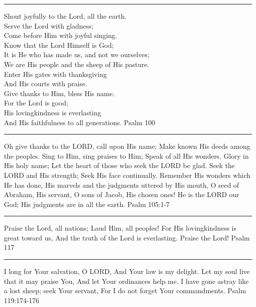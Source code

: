 \documentclass[]{book}
\begin{document}
\begin{center}\rule{0.5\linewidth}{\linethickness}\end{center}

Shout joyfully to the Lord, all the earth.\\
Serve the Lord with gladness;\\
Come before Him with joyful singing.\\
Know that the Lord Himself is God;\\
It is He who has made us, and not we ourselves;\\
We are His people and the sheep of His pasture.\\
Enter His gates with thanksgiving\\
And His courts with praise.\\
Give thanks to Him, bless His name.\\
For the Lord is good;\\
His lovingkindness is everlasting\\
And His faithfulness to all generations. \textbar{} Psalm 100

\begin{center}\rule{0.5\linewidth}{\linethickness}\end{center}

Oh give thanks to the LORD, call upon His name; Make known His deeds
among the peoples. Sing to Him, sing praises to Him; Speak of all His
wonders. Glory in His holy name; Let the heart of those who seek the
LORD be glad. Seek the LORD and His strength; Seek His face continually.
Remember His wonders which He has done, His marvels and the judgments
uttered by His mouth, O seed of Abraham, His servant, O sons of Jacob,
His chosen ones! He is the LORD our God; His judgments are in all the
earth. \textbar{} Psalm 105:1-7

\begin{center}\rule{0.5\linewidth}{\linethickness}\end{center}

Praise the Lord, all nations; Laud Him, all peoples! For His
lovingkindness is great toward us, And the truth of the Lord is
everlasting. Praise the Lord! \textbar{} Psalm 117

\begin{center}\rule{0.5\linewidth}{\linethickness}\end{center}

I long for Your salvation, O LORD, And Your law is my delight. Let my
soul live that it may praise You, And let Your ordinances help me. I
have gone astray like a lost sheep; seek Your servant, For I do not
forget Your commandments. \textbar{} Psalm 119:174-176
\end{document}
